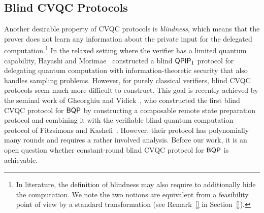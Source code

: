 







\subsection{Blind CVQC Protocols} \label{subsection:blind}



Another desirable property of CVQC protocols is  \emph{blindness}, which means that the prover does not learn any information about the private input for the delegated computation.\footnote{In literature, the definition of blindness may also require to additionally hide the computation. We note the two notions are equivalent from a feasibility point of view by a standard transformation (see Remark~\ref{} in Section~\ref{}). 
} In the relaxed setting where the verifier has a limited quantum capability, Hayashi and Morimae~\cite{hayashi2015verifiable} constructed a blind $\operatorname{\mathsf{QPIP}}_1$ protocol for delegating quantum computation with information-theoretic security that also handles sampling problems. 
%
However, for purely classical verifiers, blind CVQC protocols seem much more difficult to construct. This goal is recently achieved by the seminal work of Gheorghiu and Vidick~\cite{FOCS:GheVid19}, who constructed the first blind CVQC protocol for $\operatorname{\mathsf{BQP}}$ by constructing a composable remote state preparation protocol and combining it with the verifiable blind quantum computation protocol of Fitzsimons and Kashefi~\cite{FK17}. However, their protocol has   polynomially many rounds  and requires a rather involved analysis. Before our work, it is an open question whether constant-round blind CVQC protocol for $\operatorname{\mathsf{BQP}}$ is achievable.

